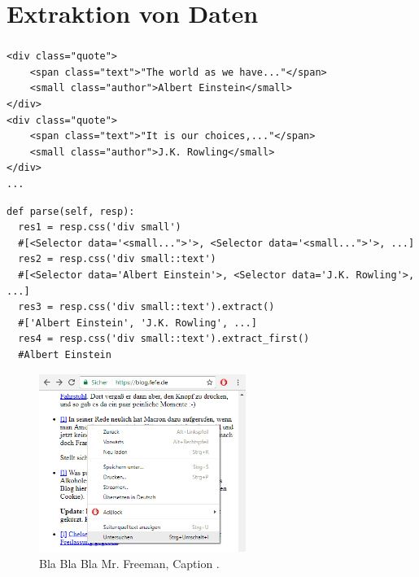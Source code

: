 \documentclass{beamer}
\begin{document}
\section{Extraktion von Daten}
\begin{frame}
	\frametitle{\insertsection{}}
	\begin{lstlisting}[basicstyle=\footnotesize]
<div class="quote">
    <span class="text">"The world as we have..."</span>
    <small class="author">Albert Einstein</small>
</div>
<div class="quote">
    <span class="text">"It is our choices,..."</span>
    <small class="author">J.K. Rowling</small>
</div>
...
	\end{lstlisting}
	\begin{lstlisting}[breaklines=true,basicstyle=\footnotesize]
def parse(self, resp):
  res1 = resp.css('div small')
  #[<Selector data='<small...">'>, <Selector data='<small...">'>, ...]
  res2 = resp.css('div small::text')
  #[<Selector data='Albert Einstein'>, <Selector data='J.K. Rowling'>, ...]
  res3 = resp.css('div small::text').extract()
  #['Albert Einstein', 'J.K. Rowling', ...]
  res4 = resp.css('div small::text').extract_first()
  #Albert Einstein
	\end{lstlisting}
	
	\framebreak
	
	
	\begin{figure}
		\begin{center}
			\includegraphics[width=0.6\textwidth]{texsrc/HTML_inspect_A}
		\end{center}
		\caption{Bla Bla Bla Mr. Freeman, Caption .} 
		\label{fig:HTML_Inspect_selection}
	\end{figure}
	

\end{frame}
\end{document}
